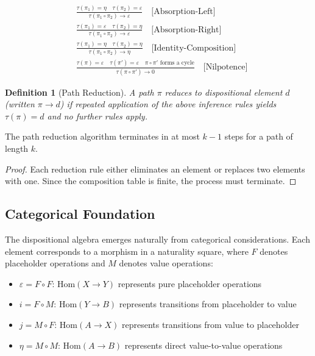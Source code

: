 \documentclass[journal]{IEEEtran}
\newtheorem{definition}{Definition}
\begin{document}
\begin{align}
&\frac{\tau(\pi_1) = \eta \quad \tau(\pi_2) = \varepsilon}{\tau(\pi_1 \circ \pi_2) \rightarrow \varepsilon} \quad \text{[Absorption-Left]} \\[0.5em]
&\frac{\tau(\pi_1) = \varepsilon \quad \tau(\pi_2) = \eta}{\tau(\pi_1 \circ \pi_2) \rightarrow \varepsilon} \quad \text{[Absorption-Right]} \\[0.5em]
&\frac{\tau(\pi_1) = \eta \quad \tau(\pi_2) = \eta}{\tau(\pi_1 \circ \pi_2) \rightarrow \eta} \quad \text{[Identity-Composition]} \\[0.5em]
&\frac{\tau(\pi) = \varepsilon \quad \tau(\pi') = \varepsilon \quad \pi \circ \pi' \text{ forms a cycle}}{\tau(\pi \circ \pi') \rightarrow 0} \quad \text{[Nilpotence]}
\end{align}

\begin{definition}[Path Reduction]
A path $\pi$ reduces to dispositional element $d$ (written $\pi \rightarrow d$) if repeated application of the above inference rules yields $\tau(\pi) = d$ and no further rules apply.
\end{definition}

\begin{theorem}[Termination]
The path reduction algorithm terminates in at most $k-1$ steps for a path of length $k$.
\end{theorem}

\begin{proof}
Each reduction rule either eliminates an element or replaces two elements with one. Since the composition table is finite, the process must terminate.
\end{proof}

\subsection{Categorical Foundation}

The dispositional algebra emerges naturally from categorical considerations. Each element corresponds to a morphism in a naturality square, where $F$ denotes placeholder operations and $M$ denotes value operations:

\begin{itemize}
\item $\varepsilon = F \circ F$: $\text{Hom}(X \to Y)$ represents pure placeholder operations
\item $i = F \circ M$: $\text{Hom}(Y \to B)$ represents transitions from placeholder to value  
\item $j = M \circ F$: $\text{Hom}(A \to X)$ represents transitions from value to placeholder  
\item $\eta = M \circ M$: $\text{Hom}(A \to B)$ represents direct value-to-value operations
\end{itemize}
\end{document}
